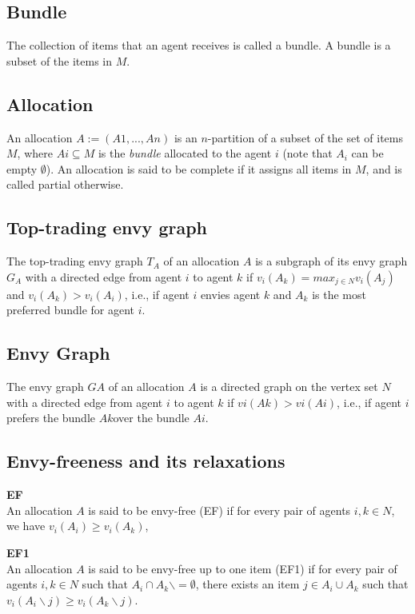 \subsection*{Bundle}
The collection of items that an agent receives is called a bundle. A bundle is a subset of the items in $M$.



\subsection*{Allocation}
An allocation $A := (A1,...,An)$ is an $n$-partition of a subset of the set of items $M$, where $Ai \subseteq M$ is the \textit{bundle} allocated to the agent $i$ (note that $A_i$ can be empty $\emptyset$). An allocation is said to be complete if it assigns all items in $M$, and is called partial otherwise.



\subsection*{Top-trading envy graph}
The top-trading envy graph $T_A$ of an allocation $A$ is a subgraph of its envy graph $G_A$ with a directed edge from agent $i$ to agent $k$ if $v_i(A_k) = max_{j\in N} v_i(A_j)$ and $v_i(A_k) > v_i(A_i)$, i.e., if agent $i$ envies agent $k$ and $A_k$ is the most preferred bundle for agent $i$.



\subsection*{Envy Graph}
The envy graph $GA$ of an allocation $A$ is a directed graph on the vertex set $N$ with a directed edge from agent $i$ to agent $k$ if $vi(Ak) > vi(Ai)$, i.e., if agent $i$ prefers the bundle $Ak$over the bundle $Ai$.



\subsection*{Envy-freeness and its relaxations}
\textbf{EF}\\
An allocation $A$ is said to be envy-free (EF) if for every pair of agents $i,k \in N$, we have $v_i(A_i) \geq v_i(A_k)$,

\textbf{EF1}\\
An allocation $A$ is said to be envy-free up to one item (EF1) if for every pair of agents $i, k \in N$ such that $A_i \cap A_k \backslash= \emptyset$, there exists an item $j \in A_i \cup A_k$ such that $v_i(A_i \backslash {j}) \geq v_i(A_k \backslash {j})$.

